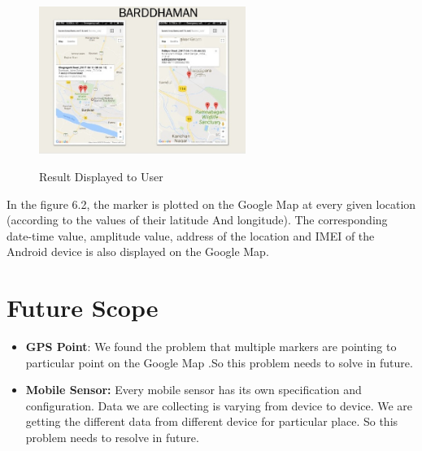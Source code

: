 \begin{figure}[!htbp]
	\centering
	\includegraphics[width=0.6\textwidth]{8.jpg}
	\label{fig:Result Displayed to User}
	\caption{Result Displayed to User}
\end{figure}

In the figure 6.2, the marker is plotted on the Google Map at every given location (according to the values of their latitude And longitude). The corresponding date-time value, amplitude value, address of the location and IMEI of the Android device is also displayed on the Google Map.

\section{Future Scope}
\begin{itemize}
	\item \textbf{GPS Point}: We found the problem that multiple markers are pointing to particular point on the Google Map .So this problem needs to solve in future.
	\item \textbf{Mobile Sensor: }Every mobile sensor has its own specification and configuration. Data we are collecting is varying from device to device. We are getting the different data from different device for particular place. So this problem needs to resolve in future.
	
\end{itemize}
